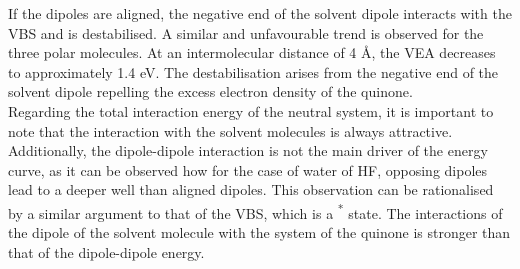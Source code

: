 If the dipoles are aligned, the negative end of the solvent dipole interacts with the VBS and is destabilised. A similar and unfavourable trend is observed for the three polar molecules. At an intermolecular distance of 4 \r{A}, the VEA decreases to approximately 1.4 eV. The destabilisation arises from the negative end of the solvent dipole repelling the excess electron density of the quinone.\\

Regarding the total interaction energy of the neutral system, it is important to note that the interaction with the solvent molecules is always attractive. Additionally, the dipole-dipole interaction is not the main driver of the energy curve, as it can be observed how for the case of water of HF, opposing dipoles lead to a deeper well than aligned dipoles. This observation can be rationalised by a similar argument to that of the VBS, which is a \textpi \textsuperscript{*} state. The interactions of the dipole of the solvent molecule with the \textpi system of the quinone is stronger than that of the dipole-dipole energy.\\

\cleardoublepage

